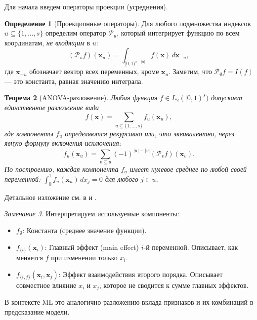 \documentclass[12pt, a4paper]{article}
\theoremstyle{plain}
\newtheorem{theorem}{Теорема}[section]
\theoremstyle{definition}
\newtheorem{definition}[theorem]{Определение}
\theoremstyle{remark}
\newtheorem{remark}[theorem]{Замечание}
\newcommand{\II}{[0, 1)}
\newcommand{\Is}{\{1, \dots, s\}}
\newcommand{\vx}{\boldsymbol{x}}
\begin{document}
Для начала введем операторы проекции (усреднения).

\begin{definition}[Проекционные операторы]
    Для любого подмножества индексов $u \subseteq \Is$ определим оператор $\mathcal{P}_u$, который интегрирует функцию по всем координатам, \textit{не входящим} в $u$:
    \begin{equation}
        (\mathcal{P}_u f)(\vx_u) = \int_{\II^{s-|u|}} f(\vx) \, d\vx_{-u},
    \end{equation}
    где $\vx_{-u}$ обозначает вектор всех переменных, кроме $\vx_u$. Заметим, что $\mathcal{P}_\emptyset f = I(f)$ --- это константа, равная значению интеграла.
\end{definition}

\begin{theorem}[ANOVA-разложение]
    Любая функция $f \in L_2(\II^s)$ допускает единственное разложение вида
    \begin{equation}
        f(\vx) = \sum_{u \subseteq \Is} f_u(\vx_u),
    \end{equation}
    где компоненты $f_u$ определяются рекурсивно или, что эквивалентно, через явную формулу включения-исключения:
    \begin{equation}
        f_u(\vx_u) = \sum_{v \subseteq u} (-1)^{|u|-|v|} (\mathcal{P}_v f)(\vx_v).
    \end{equation}
    По построению, каждая компонента $f_u$ имеет нулевое среднее по любой своей переменной: $\int_0^1 f_u(\vx_u) \, dx_j = 0$ для любого $j \in u$.
\end{theorem}

Детальное изложение см. в \cite{sloan2002high} и \cite{dick2010digital}.

\begin{remark}
    Интерпретируем используемые компоненты:
    \begin{itemize}
        \item $f_\emptyset$: Константа (среднее значение функции).
        \item $f_{\{i\}}(\vx_i)$: Главный эффект (main effect) $i$-й переменной. Описывает, как меняется $f$ при изменении только $x_i$.
        \item $f_{\{i,j\}}(\vx_i, \vx_j)$: Эффект взаимодействия второго порядка. Описывает совместное влияние $x_i$ и $x_j$, которое не сводится к сумме главных эффектов.
    \end{itemize}
    В контексте ML это аналогично разложению вклада признаков и их комбинаций в предсказание модели.
\end{remark}
\end{document}
